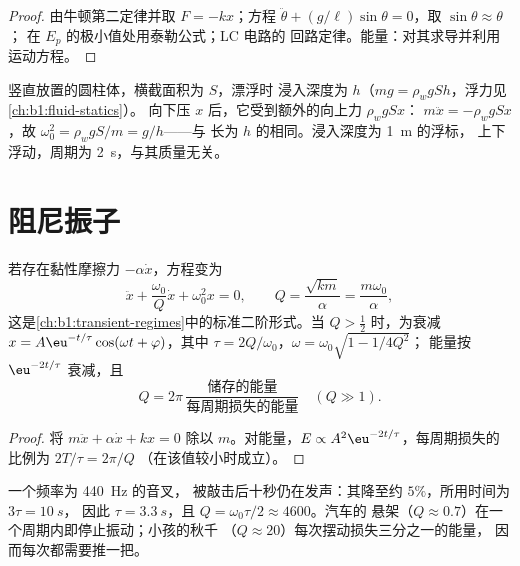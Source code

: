 \begin{proof}
由牛顿第二定律并取 $F = -kx$；方程
$\ddot\theta + (g/\ell)\sin\theta = 0$，取 $\sin\theta \approx \theta$；
在 $E_p$ 的极小值处用泰勒公式；LC 电路的
回路定律。能量：对其求导并利用运动方程。
\end{proof}

\begin{example}[上下浮动的圆柱体]\label{ex:b1:oscillators-resonance:bob}
竖直放置的圆柱体，横截面积为 $S$，漂浮时
浸入深度为 $h$（$mg = \rho_wgSh$，浮力见\cref{ch:b1:fluid-statics}）。
向下压 $x$ 后，它受到额外的向上力 $\rho_wgSx$：
$m\ddot x = -\rho_wgSx$，故 $\omega_0^2 = \rho_wgS/m = g/h$——与
长为 $h$ 的相同。浸入深度为 \qty{1}{m} 的浮标，
上下浮动，周期为 \qty{2}{s}，与其质量无关。
\end{example}

\section{阻尼振子}

\begin{proposition}[阻尼振子]\label{prop:b1:oscillators-resonance:damped}
若存在黏性摩擦力 $-\alpha\dot x$，方程变为
\[
\ddot x + \frac{\omega_0}{Q}\dot x + \omega_0^2x = 0, \qquad
Q = \frac{\sqrt{km}}{\alpha} = \frac{m\omega_0}{\alpha},
\]
这是\cref{ch:b1:transient-regimes}中的标准二阶形式。当
$Q > \tfrac12$ 时，为衰减 $x = A\eu^{-t/\tau}\cos(\omega t +
\varphi)$，其中 $\tau = 2Q/\omega_0$，$\omega = \omega_0\sqrt{1 - 1/4Q^2}$；
能量按 $\eu^{-2t/\tau}$ 衰减，且
\[
Q = 2\pi\,\frac{\text{储存的能量}}{\text{每周期损失的能量}}
\quad (Q \gg 1) .
\]
\end{proposition}

\begin{proof}
将 $m\ddot x + \alpha\dot x + kx = 0$ 除以 $m$。对能量，$E
\propto A^2\eu^{-2t/\tau}$，每周期损失的比例为 $2T/\tau = 2\pi/Q$
（在该值较小时成立）。
\end{proof}

\begin{example}[余音时长]\label{ex:b1:oscillators-resonance:ringing}
一个频率为 \qty{440}{Hz} 的音叉，
被敲击后十秒仍在发声：其降至约 $5\%$，所用时间为 $3\tau = \qty{10}{s}$，
因此 $\tau = \qty{3.3}{s}$，且 $Q = \omega_0\tau/2 \approx 4600$。汽车的
悬架（$Q \approx 0.7$）在一个周期内即停止振动；小孩的秋千
（$Q \approx 20$）每次摆动损失三分之一的能量，
因而每次都需要推一把。
\end{example}


